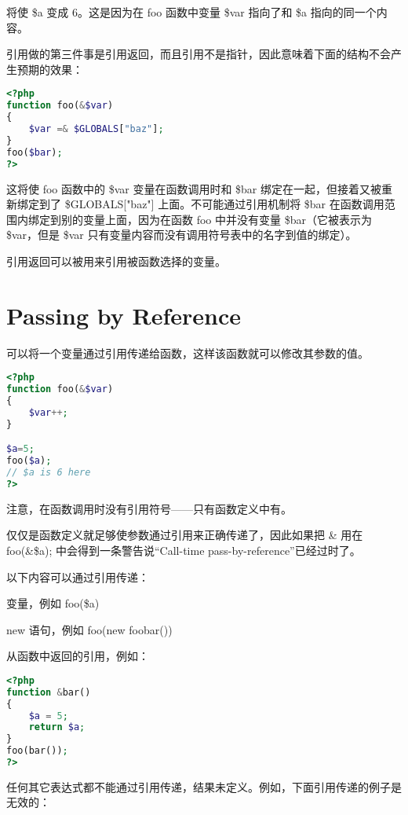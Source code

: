 将使 \$a 变成 6。这是因为在 foo 函数中变量 \$var 指向了和 \$a 指向的同一个内容。

引用做的第三件事是引用返回，而且引用不是指针，因此意味着下面的结构不会产生预期的效果：


\begin{lstlisting}[language=PHP]
<?php
function foo(&$var)
{
    $var =& $GLOBALS["baz"];
}
foo($bar);
?>
\end{lstlisting}


这将使 foo 函数中的 \$var 变量在函数调用时和 \$bar 绑定在一起，但接着又被重新绑定到了 \$GLOBALS["baz"] 上面。不可能通过引用机制将 \$bar 在函数调用范围内绑定到别的变量上面，因为在函数 foo 中并没有变量 \$bar（它被表示为 \$var，但是 \$var 只有变量内容而没有调用符号表中的名字到值的绑定）。

引用返回可以被用来引用被函数选择的变量。


\chapter{Passing by Reference}

可以将一个变量通过引用传递给函数，这样该函数就可以修改其参数的值。


\begin{lstlisting}[language=PHP]
<?php
function foo(&$var)
{
    $var++;
}

$a=5;
foo($a);
// $a is 6 here
?>
\end{lstlisting}


注意，在函数调用时没有引用符号——只有函数定义中有。

仅仅是函数定义就足够使参数通过引用来正确传递了，因此如果把 \& 用在 foo(\&\$a); 中会得到一条警告说“Call-time pass-by-reference”已经过时了。

以下内容可以通过引用传递：


\begin{compactitem}
\item 变量，例如 foo(\$a)
\item new 语句，例如 foo(new foobar())
\item 从函数中返回的引用，例如：
\end{compactitem}

\begin{lstlisting}[language=PHP]
<?php
function &bar()
{
    $a = 5;
    return $a;
}
foo(bar());
?>
\end{lstlisting}


任何其它表达式都不能通过引用传递，结果未定义。例如，下面引用传递的例子是无效的：


